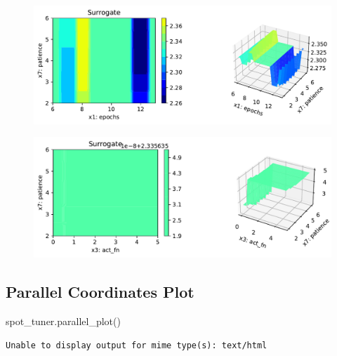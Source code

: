 \documentclass[
  letterpaper,
  DIV=11,
  numbers=noendperiod]{scrreprt}
\newenvironment{Shaded}{\begin{snugshade}}{\end{snugshade}}
\newcommand{\NormalTok}[1]{\textcolor[rgb]{0.00,0.23,0.31}{#1}}
\begin{document}
\begin{figure}[H]

{\centering \includegraphics{31_spot_lightning_csv_files/figure-pdf/cell-20-output-3.pdf}

}

\end{figure}

\begin{figure}[H]

{\centering \includegraphics{31_spot_lightning_csv_files/figure-pdf/cell-20-output-4.pdf}

}

\end{figure}

\hypertarget{parallel-coordinates-plot-5}{%
\subsection{Parallel Coordinates
Plot}\label{parallel-coordinates-plot-5}}

\begin{Shaded}
\begin{Highlighting}[]
\NormalTok{spot\_tuner.parallel\_plot()}
\end{Highlighting}
\end{Shaded}

\begin{verbatim}
Unable to display output for mime type(s): text/html
\end{verbatim}
\end{document}
